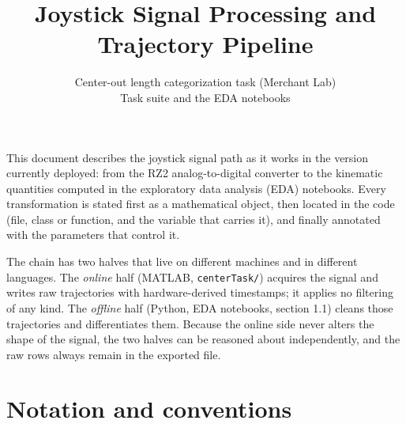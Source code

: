 \documentclass[11pt,a4paper]{article}
\title{\bfseries Joystick Signal Processing and Trajectory Pipeline}
\author{Center-out length categorization task (Merchant Lab)\\
Task suite \code{centerTask v8.26} and the EDA notebooks}
\date{}
\newcommand{\file}[1]{\texttt{\small #1}}
\begin{document}
\maketitle

\noindent
This document describes the joystick signal path as it works in the version
currently deployed: from the RZ2 analog-to-digital converter to the kinematic
quantities computed in the exploratory data analysis (EDA) notebooks. Every
transformation is stated first as a mathematical object, then located in the
code (file, class or function, and the variable that carries it), and finally
annotated with the parameters that control it.

\medskip
\noindent
The chain has two halves that live on different machines and in different
languages. The \emph{online} half (MATLAB, \file{centerTask/}) acquires the
signal and writes raw trajectories with hardware-derived timestamps; it applies
no filtering of any kind. The \emph{offline} half (Python, EDA notebooks,
section 1.1) cleans those trajectories and differentiates them. Because the
online side never alters the shape of the signal, the two halves can be reasoned
about independently, and the raw rows always remain in the exported file.

\tableofcontents
\newpage

\section{Notation and conventions}
\end{document}
